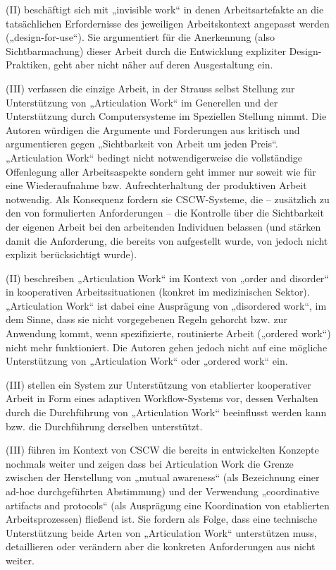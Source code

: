 \begin{description}
	\item[\citet{Suchman99}] (II) beschäftigt sich mit „invisible work“ in denen Arbeitsartefakte an die tatsächlichen Erfordernisse des jeweiligen Arbeitskontext angepasst werden („design-for-use“). Sie argumentiert für die Anerkennung (also Sichtbarmachung) dieser Arbeit durch die Entwicklung expliziter Design-Praktiken, geht aber nicht näher auf deren Ausgestaltung ein.
	\item[\citet{Star99}] (III) verfassen die einzige Arbeit, in der Strauss selbst Stellung zur Unterstützung von „Articulation Work“ im Generellen und der Unterstützung durch Computersysteme im Speziellen Stellung nimmt. Die Autoren  würdigen die Argumente und Forderungen aus \citep{Schmidt96} kritisch und argumentieren gegen „Sichtbarkeit von Arbeit um jeden Preis“. „Articulation Work“ bedingt nicht notwendigerweise die vollständige Offenlegung aller Arbeitsaspekte sondern geht immer nur soweit wie für eine Wiederaufnahme bzw. Aufrechterhaltung der produktiven Arbeit notwendig. Als Konsequenz fordern sie \gls{CSCW}-Systeme, die -- zusätzlich zu den von \citet{Schmidt96} formulierten Anforderungen -- die Kontrolle über die Sichtbarkeit der eigenen Arbeit bei den arbeitenden Individuen belassen (und stärken damit die Anforderung, die bereits von \citet{Schmidt92} aufgestellt wurde, von \citet{Schmidt96} jedoch nicht explizit berücksichtigt wurde).
	\item[\citet{Berg00}] (II) beschreiben „Articulation Work“ im Kontext von „order and disorder“ in kooperativen Arbeitssituationen (konkret im medizinischen Sektor). „Articulation Work“ ist dabei eine Ausprägung von „disordered work“, im dem Sinne, dass sie nicht vorgegebenen Regeln gehorcht bzw. zur Anwendung kommt, wenn spezifizierte, routinierte Arbeit („ordered work“) nicht mehr funktioniert. Die Autoren gehen jedoch nicht auf eine mögliche Unterstützung von „Articulation Work“ oder „ordered work“ ein.
	\item[\citet{Divitini00}] (III) stellen ein System zur Unterstützung von etablierter kooperativer Arbeit in Form eines adaptiven Workflow-Systems vor, dessen Verhalten durch die Durchführung von „Articulation Work“ beeinflusst werden kann bzw. die Durchführung derselben unterstützt.
	\item[\citet{Schmidt00}] (III) führen im Kontext von CSCW die bereits in \citep{Schmidt96} entwickelten Konzepte nochmals weiter und zeigen dass bei Articulation Work die Grenze zwischen der Herstellung von „mutual awareness“ (als Bezeichnung einer ad-hoc durchgeführten Abstimmung) und der Verwendung „coordinative artifacts and protocols“ (als Ausprägung eine Koordination von etablierten Arbeitsprozessen) fließend ist. Sie fordern als Folge, dass eine technische Unterstützung beide Arten von „Articulation Work“ unterstützen muss, detaillieren oder verändern aber die konkreten Anforderungen aus \citep{Schmidt96} nicht weiter.

\end{description}
